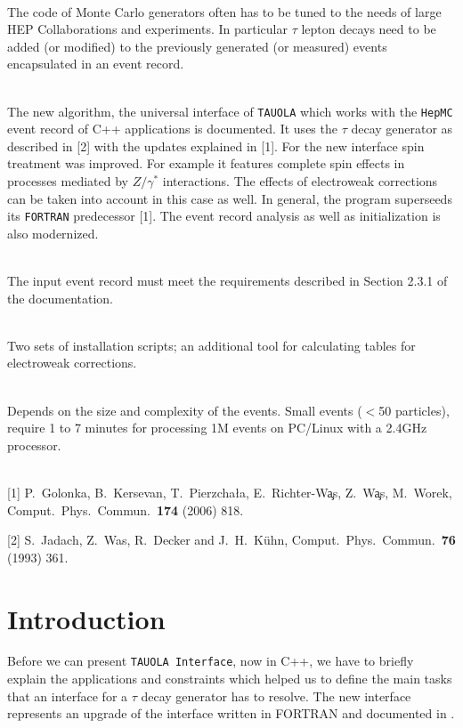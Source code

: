 \documentclass[]{Tauola_interface_design}
\begin{document}
\\
The code of Monte Carlo generators often has to be tuned to the needs of large HEP
Collaborations and experiments. In particular $\tau$ lepton decays need to be added (or modified)
to the previously generated (or measured) events encapsulated in an event record. 



\\
The new algorithm, the universal interface of {\tt TAUOLA} which works with the {\tt HepMC} event record
 of C++ applications is documented. It
uses the $\tau$ decay generator as described in [2]  with the updates explained in [1]. 
For the new interface  spin treatment was improved. For example it features complete spin
effects in processes mediated by $Z/\gamma^*$ interactions. The effects of electroweak corrections 
can be taken into account in this case as well. In general, the program
 superseeds its {\tt FORTRAN} predecessor [1]. The event record analysis as well as initialization is
also modernized.


\\
The input event record must meet the requirements described in Section 2.3.1 of the documentation.


\\
Two sets of installation scripts; an additional tool for calculating tables for electroweak corrections.


\\
Depends on the size and complexity of the events.
Small events ($<$50 particles), require 1 to 7 minutes for processing 1M events on PC/Linux with a 2.4GHz processor.


 \\

[1] P.~Golonka, B.~Kersevan, T.~Pierzcha\l{}a, E.~Richter-W\c as, Z.~W\c as, M.~Worek,   Comput.\ Phys.\ Commun.\  {\bf 174} (2006) 818.

[2] S.~Jadach, Z.~Was, R.~Decker and J.~H.~K\"uhn,  Comput.\ Phys.\ Commun.\  {\bf 76} (1993) 361.

\newpage

\section{Introduction}
Before we can present  {\tt TAUOLA Interface}, now in C++, 
we have to briefly explain
the applications and constraints which helped us
to define the main tasks that an interface 
for a $\tau$ decay generator has to resolve. The new interface represents an upgrade of the interface written in FORTRAN and documented in \cite{Golonka:2003xt}.
\end{document}
